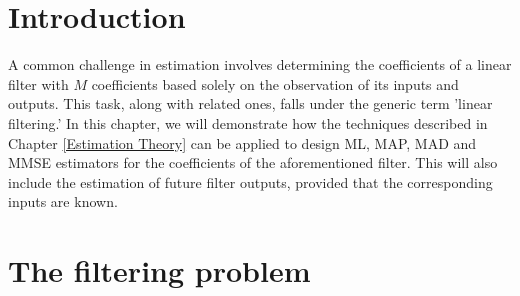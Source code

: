 \newcommand{\x}{{\mathbf x}}
\newcommand{\s}{{\mathbf s}}
\newcommand{\uu}{{\mathbf u}}
\newcommand{\UU}{{\mathbf U}}
\newcommand{\PP}{{\mathbf P}}
\newcommand{\Ruu}{{\mathbf R}_{uu}}
\newcommand{\rux}{{\mathbf r}_{ux}}
\newcommand{\hRuu}{\hat{\mathbf R}_{uu}}
\newcommand{\hrux}{\hat {\mathbf r}_{ux}}


\newcommand{\pp}{{\mathbf r}}
\newcommand{\eye}{{\mathbf I}}
\newcommand{\Normal}{{\mathcal N}}
\newcommand{\bigO	}{{\mathcal O}}



\label{cha:FiltradoLinea}

\section{Introduction}

A common challenge in estimation involves determining the coefficients of a linear filter with $M$ coefficients based solely on the observation of its inputs and outputs. This task, along with related ones, falls under the generic term 'linear filtering.' In this chapter, we will demonstrate how the techniques described in Chapter \ref{Estimation Theory} can be applied to design ML, MAP, MAD and MMSE estimators for the coefficients of the aforementioned filter. This will also include the estimation of future filter outputs, provided that the corresponding inputs are known.

\section{The filtering problem}


